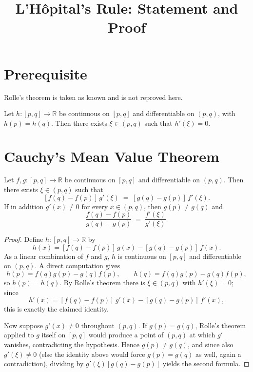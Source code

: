 \documentclass{essay}
\title{L'H\^opital's Rule: Statement and Proof}
\author{}
\date{}
\begin{document}
\maketitle

\section{Prerequisite}

Rolle's theorem is taken as known and is not reproved here.

\begin{theorem}[Rolle]
  Let \(h:[p,q]\to\mathbb{R}\) be continuous on \([p,q]\) and differentiable on \((p,q)\), with \(h(p)=h(q)\). Then there exists \(\xi\in(p,q)\) such that \(h'(\xi)=0\).
\end{theorem}

\section{Cauchy's Mean Value Theorem}

\begin{lemma}[Cauchy]
  Let \(f,g:[p,q]\to\mathbb{R}\) be continuous on \([p,q]\) and differentiable on \((p,q)\). Then there exists \(\xi\in(p,q)\) such that
  \[ [f(q)-f(p)]\,g'(\xi) \;=\; [g(q)-g(p)]\,f'(\xi). \]
  If in addition \(g'(x)\neq 0\) for every \(x\in(p,q)\), then \(g(p)\neq g(q)\) and
  \[ \frac{f(q)-f(p)}{g(q)-g(p)} \;=\; \frac{f'(\xi)}{g'(\xi)}. \]
\end{lemma}

\begin{proof}
  Define \(h:[p,q]\to\mathbb{R}\) by
  \[ h(x) = [f(q)-f(p)]\,g(x) - [g(q)-g(p)]\,f(x). \]
  As a linear combination of \(f\) and \(g\), \(h\) is continuous on \([p,q]\) and differentiable on \((p,q)\). A direct computation gives
  \[ h(p) = f(q)g(p) - g(q)f(p), \qquad h(q) = f(q)g(p) - g(q)f(p), \]
  so \(h(p)=h(q)\). By Rolle's theorem there is \(\xi\in(p,q)\) with \(h'(\xi)=0\); since
  \[ h'(x) = [f(q)-f(p)]\,g'(x) - [g(q)-g(p)]\,f'(x), \]
  this is exactly the claimed identity.

  Now suppose \(g'(x)\neq 0\) throughout \((p,q)\). If \(g(p)=g(q)\), Rolle's theorem applied to \(g\) itself on \([p,q]\) would produce a point of \((p,q)\) at which \(g'\) vanishes, contradicting the hypothesis. Hence \(g(p)\neq g(q)\), and since also \(g'(\xi)\neq 0\) (else the identity above would force \(g(p)=g(q)\) as well, again a contradiction), dividing by \(g'(\xi)[g(q)-g(p)]\) yields the second formula.
\end{proof}
\end{document}
